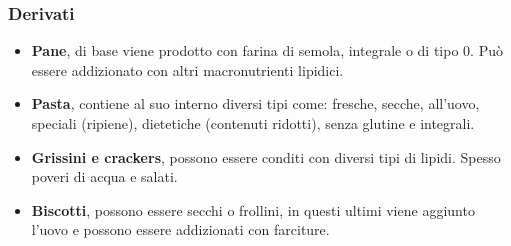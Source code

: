 \documentclass[10pt]{article}
\begin{document}
\subsubsection{Derivati}
\begin{itemize}
\item\textbf{Pane}, di base viene prodotto con farina di semola, integrale o di tipo 0. Può essere addizionato con altri macronutrienti lipidici.
\item\textbf{Pasta}, contiene al suo interno diversi tipi come: fresche, secche, all'uovo, speciali (ripiene), dietetiche (contenuti ridotti), senza glutine e integrali.
\item\textbf{Grissini e crackers}, possono essere conditi con diversi tipi di lipidi. Spesso poveri di acqua e salati. 
\item\textbf{Biscotti}, possono essere secchi o frollini, in questi ultimi viene aggiunto l'uovo e possono essere addizionati con farciture.
\end{itemize}
\end{document}
